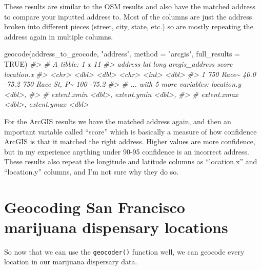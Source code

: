 \documentclass[
]{krantz}
\makeatletter
\newenvironment{Shaded}{\begin{snugshade}}{\end{snugshade}}
\newcommand{\AttributeTok}[1]{\textcolor[rgb]{0.61,0.61,0.61}{#1}}
\newcommand{\CommentTok}[1]{\textcolor[rgb]{0.37,0.37,0.37}{\textit{#1}}}
\newcommand{\ConstantTok}[1]{\textcolor[rgb]{0,0,0}{#1}}
\newcommand{\FunctionTok}[1]{\textcolor[rgb]{0,0,0}{#1}}
\newcommand{\NormalTok}[1]{#1}
\newcommand{\StringTok}[1]{\textcolor[rgb]{0.5,0.5,0.5}{#1}}
\newenvironment{kframe}{%
\medskip{}
\setlength{\fboxsep}{.8em}
 \def\at@end@of@kframe{}%
 \ifinner\ifhmode%
  \def\at@end@of@kframe{\end{minipage}}%
  \begin{minipage}{\columnwidth}%
 \fi\fi%
 \def\FrameCommand##1{\hskip\@totalleftmargin \hskip-\fboxsep
 \colorbox{shadecolor}{##1}\hskip-\fboxsep
     \hskip-\linewidth \hskip-\@totalleftmargin \hskip\columnwidth}%
 \MakeFramed {\advance\hsize-\width
   \@totalleftmargin\z@ \linewidth\hsize
   \@setminipage}}%
 {\par\unskip\endMakeFramed%
 \at@end@of@kframe}
\renewenvironment{Shaded}{\begin{kframe}}{\end{kframe}}
\makeatother
\begin{document}
These results are similar to the OSM results and also have the matched address to compare your inputted address to. Most of the columns are just the address broken into different pieces (street, city, state, etc.) so are mostly repeating the address again in multiple columns.

\begin{Shaded}
\begin{Highlighting}[]
\FunctionTok{geocode}\NormalTok{(address\_to\_geocode, }\StringTok{"address"}\NormalTok{, }\AttributeTok{method =} \StringTok{"arcgis"}\NormalTok{, }\AttributeTok{full\_results =} \ConstantTok{TRUE}\NormalTok{)}
\CommentTok{\#\textgreater{} \# A tibble: 1 x 11}
\CommentTok{\#\textgreater{}   address     lat  long arcgis\_address  score location.x}
\CommentTok{\#\textgreater{}   \textless{}chr\textgreater{}     \textless{}dbl\textgreater{} \textless{}dbl\textgreater{} \textless{}chr\textgreater{}           \textless{}int\textgreater{}      \textless{}dbl\textgreater{}}
\CommentTok{\#\textgreater{} 1 750 Race\textasciitilde{}  40.0 {-}75.2 750 Race St, P\textasciitilde{}   100      {-}75.2}
\CommentTok{\#\textgreater{} \# ... with 5 more variables: location.y \textless{}dbl\textgreater{},}
\CommentTok{\#\textgreater{} \#   extent.xmin \textless{}dbl\textgreater{}, extent.ymin \textless{}dbl\textgreater{},}
\CommentTok{\#\textgreater{} \#   extent.xmax \textless{}dbl\textgreater{}, extent.ymax \textless{}dbl\textgreater{}}
\end{Highlighting}
\end{Shaded}

For the ArcGIS results we have the matched address again, and then an important variable called ``score'' which is basically a measure of how confidence ArcGIS is that it matched the right address. Higher values are more confidence, but in my experience anything under 90-95 confidence is an incorrect address. These results also repeat the longitude and latitude columns as ``location.x'' and ``location.y'' columns, and I'm not sure why they do so.

\hypertarget{geocoding-san-francisco-marijuana-dispensary-locations}{%
\section{Geocoding San Francisco marijuana dispensary locations}\label{geocoding-san-francisco-marijuana-dispensary-locations}}

So now that we can use the \texttt{geocoder()} function well, we can geocode every location in our marijuana dispersary data.
\end{document}
